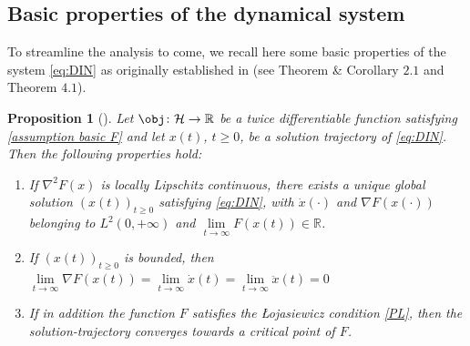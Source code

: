 \documentclass[reqno]{amsart}
\theoremstyle{plain}
\newtheorem{proposition}{Proposition}	%
\theoremstyle{definition}
\theoremstyle{remark}
\newcommand{\R}{\mathbb{R}}	%
\newcommand{\from}{\colon}	%
\newcommand{\VA}{\VAcomment}
\newcommand{\Bl}[1]{\ball\mathopen{}\left(#1\right)}
\newcommand{\Hb}{\mathcal{H}}
\newcommand{\PM}[1]{}
\begin{document}





\subsection{Basic properties of the dynamical system}

To streamline the analysis to come, we recall here some basic properties of the system \eqref{eq:DIN} as originally established in \cite{alvarez2002second} (see Theorem \& Corollary $2.1$ and Theorem $4.1$). 

\PM{Minor rewriting needed here.}
\begin{proposition}[\cite{alvarez2002second}]\label{proposition basic}
	Let $\obj\from\Hb\to\R$ be a twice differentiable function satisfying \cref{assumption basic F} and let $x(t)$, $t\geq 0$, be a solution trajectory of \eqref{eq:DIN}. Then the following properties hold:
	\begin{enumerate}[label=\roman*)]
		\item If $\nabla^{2}F(x)$ is locally Lipschitz continuous, there exists a unique global solution $(x(t))_{t\geq 0}$ satisfying \eqref{eq:DIN}, with $\dot{x}(\cdot)$ and $\nabla F(x(\cdot))$ belonging to $L^{2}(0,+\infty)$ and $\lim\limits_{t\to\infty}F(x(t))\in \R$. 
		\item If $(x(t))_{t\geq 0}$ is bounded, then
		$\lim\limits_{t\to\infty}\nabla F(x(t)) = \lim\limits_{t\to\infty}\dot{x}(t)=\lim\limits_{t\to\infty}\ddot{x}(t) = 0$
		\item If in addition the function $F$ satisfies the \L ojasiewicz condition \ref{PL}, then the solution-trajectory converges towards a critical point of $F$.
	\end{enumerate} 
	
\end{proposition}
\end{document}

